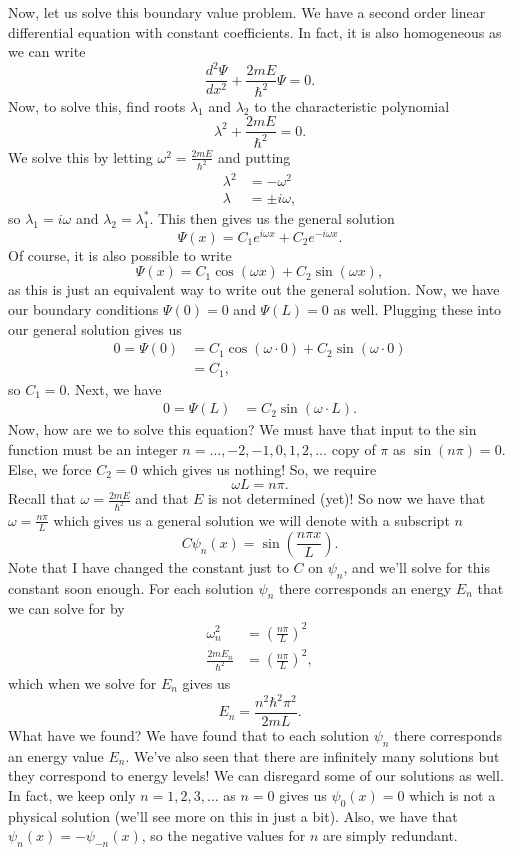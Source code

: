Now, let us solve this boundary value problem.  We have a second order linear differential equation with constant coefficients. In fact, it is also homogeneous as we can write 
\[
\frac{d^2\Psi}{dx^2}+\frac{2mE}{\hbar^2}\Psi =0.
\]
Now, to solve this, find roots $\lambda_1$ and $\lambda_2$ to the characteristic polynomial
\[
\lambda^2+\frac{2mE}{\hbar^2}=0.
\]
We solve this by letting $\omega^2 = \frac{2mE}{\hbar^2}$ and putting
\begin{align*}
    \lambda^2&=-\omega^2\\
    \lambda&=\pm i \omega,
\end{align*}
so $\lambda_1=i\omega$ and $\lambda_2=\lambda_1^*$. This then gives us the general solution
\[
\Psi(x)=C_1 e^{i\omega x}+C_2 e^{-i\omega x}.
\]
Of course, it is also possible to write 
\[
\Psi(x)=C_1\cos(\omega x)+C_2\sin(\omega x),
\]
as this is just an equivalent way to write out the general solution. Now, we have our boundary conditions $\Psi(0)=0$ and $\Psi(L)=0$ as well.  Plugging these into our general solution gives us
\begin{align*}
    0=\Psi(0)&=C_1 \cos(\omega \cdot 0)+C_2 \sin(\omega \cdot 0)\\
    &= C_1,
\end{align*}
so $C_1=0$.  Next, we have
\begin{align*}
    0=\Psi(L)&=C_2\sin(\omega \cdot L).
\end{align*}
Now, how are we to solve this equation? We must have that input to the sin function must be an integer $n=\dots,-2,-1,0,1,2,\dots$ copy of $\pi$ as $\sin(n\pi)=0$. Else, we force $C_2=0$ which gives us nothing!  So, we require
\[
\omega L = n\pi.
\]
Recall that $\omega = \frac{2mE}{\hbar^2}$ and that $E$ is not determined (yet)! So now we have that $\omega = \frac{n\pi}{L}$ which gives us a general solution we will denote with a subscript $n$
\[
C\psi_n(x)=\sin\left(\frac{n\pi x}{L}\right).
\]
Note that I have changed the constant just to $C$ on $\psi_n$, and we'll solve for this constant soon enough.  For each solution $\psi_n$ there corresponds an energy $E_n$ that we can solve for by
\begin{align*}
    \omega_n^2  &= \left(\frac{n \pi}{L}\right)^2\\
    \frac{2mE_n}{\hbar^2}&= \left(\frac{n\pi}{L}\right)^2,
\end{align*}
which when we solve for $E_n$ gives us
\[
   \boxed{E_n = \frac{n^2\hbar^2\pi^2}{2mL}.}
\]
What have we found? We have found that to each solution $\psi_n$ there corresponds an energy value $E_n$. We've also seen that there are infinitely many solutions but they correspond to  energy levels! We can disregard some of our solutions as well. In fact, we keep only $n=1,2,3,\dots$ as $n=0$ gives us $\psi_0(x)=0$ which is not a physical solution (we'll see more on this in just a bit).  Also, we have that $\psi_n(x)=-\psi_{-n}(x)$, so the negative values for $n$ are simply redundant.

